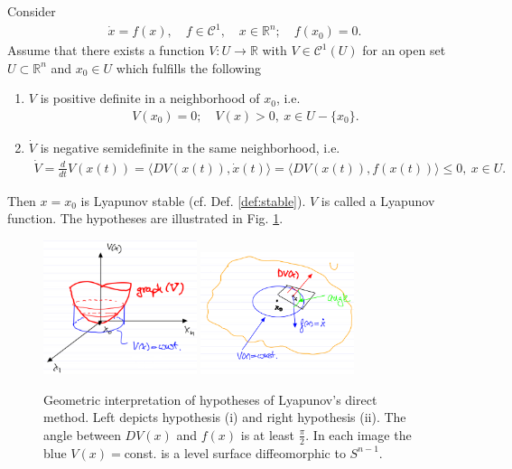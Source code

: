 \begin{theorem}[] \label{thm:direct}
	Consider
	\begin{align}
		\dot{x} = f(x), \quad f\in \mathcal{C}^1,\quad x \in \mathbb{R}^{n};\quad f(x_0) = 0.
	\end{align}
	Assume that there exists a function $V:U \to \mathbb{R}$ with $V\in \mathcal{C}^1(U)$ for an open set $U \subset \mathbb{R}^{n}$ and $x_0 \in U$ which fulfills the following
	\begin{enumerate}
		\item $V$ is positive definite in a neighborhood of $x_0$, i.e.
			\begin{align}
				V(x_0)=0;\quad V(x)>0,\ x\in U-\{ x_0 \}.
			\end{align}
		\item $\dot{V}$ is negative semidefinite in the same neighborhood, i.e.
			\begin{align}
				\dot{V} =\frac{d}{dt}V(x(t))= 
				\langle DV(x(t)), \dot{x}(t) \rangle =
				\langle DV(x(t)), f(x(t)) \rangle \leq 0,\ x\in U.
			\end{align}
	\end{enumerate}
	Then $x=x_0$ is Lyapunov stable (cf. Def. \ref{def:stable}). $V$ is called a Lyapunov function. The hypotheses are illustrated in Fig. \ref{fig:lyap_thm_assumptions}.	
\end{theorem}
\begin{figure}[h!]
	\centering
	\includegraphics[width=0.4\textwidth]{figures/ch2/23lyap_thm_assumptions1.png}
	\hspace{0.05\textwidth}
	\includegraphics[width=0.4\textwidth]{figures/ch2/23lyap_thm_assumptions2.png}
	\caption{Geometric interpretation of hypotheses of Lyapunov's direct method. Left depicts hypothesis (i) and right hypothesis (ii). The angle between $DV(x)$ and $f(x)$ is at least $\frac{\pi }{2}$. In each image the blue $V(x)=$const. is a level surface diffeomorphic to $S^{n-1}$.}
	\label{fig:lyap_thm_assumptions}
\end{figure}

